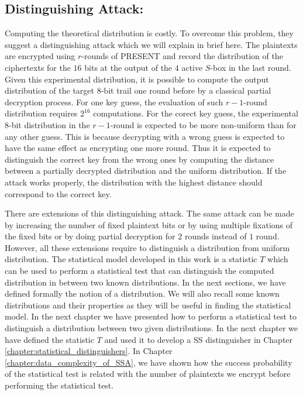 \subsection{Distinguishing Attack:} Computing the theoretical distribution is costly. To overcome this problem, they suggest a distinguishing attack which we will explain in brief here. The plaintexts are encrypted using $r$-rounds of PRESENT and record the distribution of the ciphertexts for the $16$ bits at the output of the $4$ active $S$-box in the last round. Given this experimental distribution, it is possible to compute the output distribution of the target $8$-bit trail one round before by a classical partial decryption process. For one key guess, the evaluation of such $r-1$-round distribution requires $2^{16}$ computations. For the corect key guess, the experimental $8$-bit distribution in the $r-1$-round is expected to be more non-uniform than for any other guess. This is because decrypting with a wrong guess is expected to have the same effect as encrypting one more round. Thus it is expected to distinguish the correct key from the wrong ones by computing the distance between a partially decrypted distribution and the uniform distribution. If the attack works properly, the distribution with the highest distance should correspond to the correct key. \par \noindent There are extensions of this distinguishing attack. The same attack can be made by increasing the number of fixed plaintext bits or by using multiple fixations of the fixed bits or by doing partial decryption for $2$ rounds instead of $1$ round. However, all these extensions require to distinguish a distribution from uniform distribution. The statistical model developed in this work is a statistic $T$ which can be used to perform a statistical test that can distinguish the computed distribution in between two known distributions. In the next sections, we have defined formally the notion of a distribution. We will also recall some known distributions and their properties as they will be useful in finding the statistical model. In the next chapter we have presented how to perform a statistical test to distinguish a distribution between two given distributions. In the next chapter we have defined the statistic $T$ and used it to develop a SS distinguisher in Chapter \ref{chapter:statistical_distinguishers}. In Chapter \ref{chapter:data_complexity_of_SSA}, we have shown how the success probability of the statistical test is related with the number of plaintexts we encrypt before performing the statistical test.
